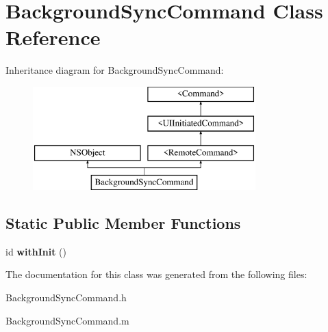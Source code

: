 \hypertarget{interface_background_sync_command}{
\section{\-Background\-Sync\-Command \-Class \-Reference}
\label{interface_background_sync_command}
}
\-Inheritance diagram for \-Background\-Sync\-Command\-:\begin{figure}[H]
\begin{center}
\leavevmode
\includegraphics[height=4.000000cm]{interface_background_sync_command}
\end{center}
\end{figure}
\subsection*{\-Static \-Public \-Member \-Functions}
\begin{DoxyCompactItemize}
\item 
\hypertarget{interface_background_sync_command_a8be7c733df8c356ef2d4bc5f45017768}{
id {\bfseries with\-Init} ()}
\label{interface_background_sync_command_a8be7c733df8c356ef2d4bc5f45017768}

\end{DoxyCompactItemize}


\-The documentation for this class was generated from the following files\-:\begin{DoxyCompactItemize}
\item 
\-Background\-Sync\-Command.\-h\item 
\-Background\-Sync\-Command.\-m\end{DoxyCompactItemize}

